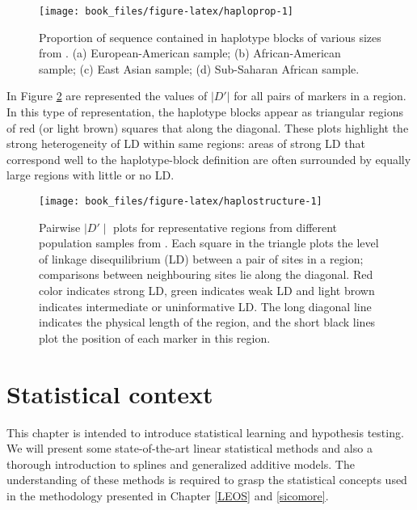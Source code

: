 \documentclass[]{book}
\begin{document}
\begin{figure}

{\centering \texttt{[image: book\_files/figure-latex/haploprop-1]} 

}

\caption{Proportion of sequence contained in haplotype blocks of various sizes from \citep{wall2003haplotype}. (a) European-American sample; (b) African-American sample; (c) East Asian sample; (d) Sub-Saharan African sample.}\label{fig:haploprop}
\end{figure}

In Figure \ref{fig:haplostructure} are represented the values of \(|D'|\)
for all pairs of markers in a region. In this type of representation,
the haplotype blocks appear as triangular regions of red (or light
brown) squares that along the diagonal. These plots highlight the strong
heterogeneity of LD within same regions: areas of strong LD that
correspond well to the haplotype-block definition are often surrounded
by equally large regions with little or no LD.



\begin{figure}

{\centering \texttt{[image: book\_files/figure-latex/haplostructure-1]} 

}

\caption{Pairwise \(\mid D' \mid\) plots for representative regions from different population samples from \citep{wall2003haplotype}. Each square in the triangle plots the level of linkage disequilibrium (LD) between a pair of sites in a region; comparisons between neighbouring sites lie along the diagonal. Red color indicates strong LD, green indicates weak LD and light brown indicates intermediate or uninformative LD. The long diagonal line indicates the physical length of the region, and the short black lines plot the position of each marker in this region.}\label{fig:haplostructure}
\end{figure}

\hypertarget{statistical-context}{%
\chapter{Statistical context}\label{statistical-context}}

This chapter is intended to introduce statistical learning and hypothesis testing. We will present some state-of-the-art linear statistical methods and also a thorough introduction to splines and generalized additive models. The understanding of these methods is required to grasp the statistical concepts used in the methodology presented in Chapter \ref{LEOS} and \ref{sicomore}.
\end{document}
